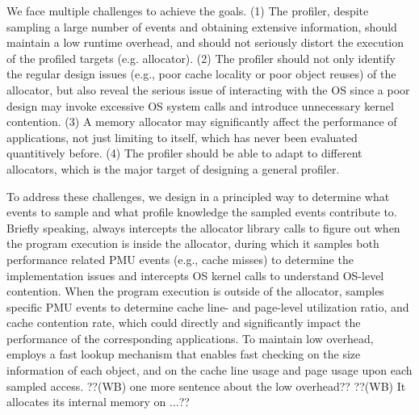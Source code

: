 We face multiple challenges to achieve the goals. (1) The profiler, despite sampling a large number of events and obtaining extensive information, should maintain a low runtime overhead, and should not seriously distort the execution of the profiled targets (e.g. allocator).  (2) The profiler should not only identify the regular design issues (e.g., poor cache locality or poor object reuses) of the allocator, but also reveal the serious issue of interacting with the OS since a poor design may invoke excessive OS system calls and introduce unnecessary kernel contention. (3) A memory allocator may significantly affect the performance of applications, not just limiting to itself, which has never been evaluated quantitively before. (4) The profiler should be able to adapt to different allocators, which is the major target of designing a general profiler.   

To address these challenges, we design \MP{} in a principled way to determine what events to sample and what profile knowledge the sampled events contribute to. Briefly speaking, \MP{} always intercepts the allocator library calls to figure out when the program execution is inside the allocator, during which it samples both performance related PMU events (e.g., cache misses) to determine the implementation issues and intercepts OS kernel calls to understand OS-level contention. When the program execution is outside of the allocator, \MP{} samples specific PMU events to determine cache line- and page-level utilization ratio, and cache contention rate, which could directly and significantly impact the performance of the corresponding applications. To maintain low overhead, \MP{} employs a fast lookup mechanism that enables fast checking on the size information of each object, and on the cache line usage and page usage upon each sampled access. ??(WB) one more sentence about the low overhead?? ??(WB) It allocates its internal memory on ...??

